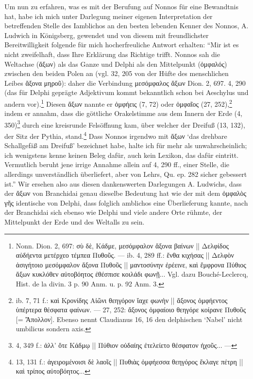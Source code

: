 \documentclass[a4paper, 11pt, oneside]{article}
\begin{document}
Um nun zu erfahren, was es mit der Berufung auf Nonnos für eine Bewandtnis hat, habe ich mich unter Darlegung meiner eigenen Interpretation der betreffenden Stelle des Iamblichos an den besten lebenden Kenner des Nonnos, A. Ludwich in Königsberg, gewendet und von diesem mit freundlichster Bereitwilligkeit folgende für mich hocherfreuliche Antwort erhalten: "`Mir ist es nicht zweifelhaft, dass Ihre Erklärung das Richtige trifft. Nonnos sah die Weltachse (ἄξων) als das Ganze und Delphi als den Mittelpunkt (ὀμφαλός) zwischen den beiden Polen an (vgl. 32, 205 von der Hüfte des menschlichen Leibes ἄξονα μηροῦ): daher die Verbindung μεσόμφαλος ἄξων Dion. 2, 697. 4, 290 (das für Delphi geprägte Adjektivum kommt bekanntlich schon bei Aeschylus und andern vor).\footnote{Nonn. Dion. 2, 697: σὺ δὲ, Κάδμε, μεσόμφαλον ἄξονα βαίνων || Δελφίδος αὐδήεντα μετέρχεο τέμπεα Πυθοῦς. --- ib. 4, 289 ff.: ἔνθα κιχήσας || Δελφὸν ἀσιγήτοιο μεσόμφαλον ἄξονα Πυθοῦς || μαντοσύνην ἐρέεινε, καὶ ἔμφρονα Πύθιος ἄξων κυκλόθεν αὐτοβόητος ἐθέσπισε κοιλάδι φωνῇ... Vgl. dazu Bouché-Leclercq, Hist. de la divin. 3 p. 90 Anm. u. p. 92 Anm. 3.} Diesen ἄξων nannte er ὀμφήεις (7, 72) oder ὀμφαῖος (27, 252),\footnote{ib. 7, 71 f.: καὶ Κρονίδης Αἰῶνι θεηγόρον ἴαχε φωνὴν || ἄξονος ὀμφήεντος ὑπέρτερα θέσφατα φαίνων. --- 27, 252: ἄξονος ὀμφαίοιο θεηγόρε κοίρανε Πυθοῦς [= Ἄπολλον]. Ebenso nennt Claudianus 16, 16 den delphischen `Nabel' nicht umbilicus sondern axis.} indem er annahm, dass die göttliche Orakelstimme aus dem Innern der Erde (4, 350)\footnote{4, 349 f.: ἀλλ' ὅτε Κάδμῳ || Πύθιον οὐδαίης ἐτελείετο θέσφατον ἠχοῦς... ---} durch eine kreisrunde Felsöffnung kam, über welcher der Dreifuß (13, 132), der Sitz der Pythia, stand.\footnote{13, 131 f.: ἀγειρομένοισι δὲ λαοῖς || Πυθιὰς ὀμφήεσσα θεηγόρος ἔκλαγε πέτρη || καὶ τρίπος αὐτοβόητος...} Dass Nonnos irgendwo mit ἄξων `das drehbare Schallgefäß am Dreifuß' bezeichnet habe, halte ich für mehr als unwahrscheinlich; ich wenigstens kenne keinen Beleg dafür, auch kein Lexikon, das dafür eintritt. Vermutlich beruht jene irrige Annahme allein auf 4, 290 ff., einer Stelle, die allerdings unverständlich überliefert, aber von Lehrs, Qu. ep. 282 sicher gebessert ist."' Wir ersehen also aus diesen dankenswerten Darlegungen A. Ludwichs, dass der ἄξων von Branchidai genau dieselbe Bedeutung hat wie der mit dem ὀμφαλὸς γῆς identische von Delphi, dass folglich amblichos eine Überlieferung kannte, nach der Branchidai sich ebenso wie Delphi und viele andere Orte rühmte, der Mittelpunkt der Erde und des Weltalls zu sein.
\end{document}
